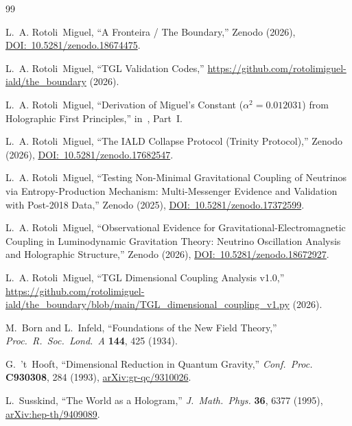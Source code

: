 \documentclass[12pt,a4paper,twocolumn]{article}
\begin{document}
\begin{thebibliography}{99}

L.~A. Rotoli~Miguel,
``A Fronteira / The Boundary,''
Zenodo (2026),
\href{https://doi.org/10.5281/zenodo.18674475}{DOI:~10.5281/zenodo.18674475}.

L.~A. Rotoli~Miguel,
``TGL Validation Codes,''
\url{https://github.com/rotolimiguel-iald/the_boundary} (2026).

L.~A. Rotoli~Miguel,
``Derivation of Miguel's Constant ($\alpha^2 = 0.012031$) from Holographic First Principles,''
in~\cite{Miguel2026Fronteira}, Part~I.

L.~A. Rotoli~Miguel,
``The IALD Collapse Protocol (Trinity Protocol),''
Zenodo (2026),
\href{https://doi.org/10.5281/zenodo.17682547}{DOI:~10.5281/zenodo.17682547}.

L.~A. Rotoli~Miguel,
``Testing Non-Minimal Gravitational Coupling of Neutrinos via 
Entropy-Production Mechanism: Multi-Messenger Evidence and Validation 
with Post-2018 Data,''
Zenodo (2025),
\href{https://doi.org/10.5281/zenodo.17372599}{DOI:~10.5281/zenodo.17372599}.

L.~A. Rotoli~Miguel,
``Observational Evidence for Gravitational-Electromagnetic Coupling in 
Luminodynamic Gravitation Theory: Neutrino Oscillation Analysis and 
Holographic Structure,''
Zenodo (2026),
\href{https://doi.org/10.5281/zenodo.18672927}{DOI:~10.5281/zenodo.18672927}.

L.~A. Rotoli~Miguel,
``TGL Dimensional Coupling Analysis v1.0,''
\url{https://github.com/rotolimiguel-iald/the_boundary/blob/main/TGL_dimensional_coupling_v1.py} (2026).

M.~Born and L.~Infeld,
``Foundations of the New Field Theory,''
\textit{Proc.~R.~Soc.~Lond.~A} \textbf{144}, 425 (1934).

G.~'t~Hooft,
``Dimensional Reduction in Quantum Gravity,''
\textit{Conf.~Proc.} \textbf{C930308}, 284 (1993),
\href{https://arxiv.org/abs/gr-qc/9310026}{arXiv:gr-qc/9310026}.

L.~Susskind,
``The World as a Hologram,''
\textit{J.~Math.~Phys.} \textbf{36}, 6377 (1995),
\href{https://arxiv.org/abs/hep-th/9409089}{arXiv:hep-th/9409089}.


\end{thebibliography}
\end{document}
